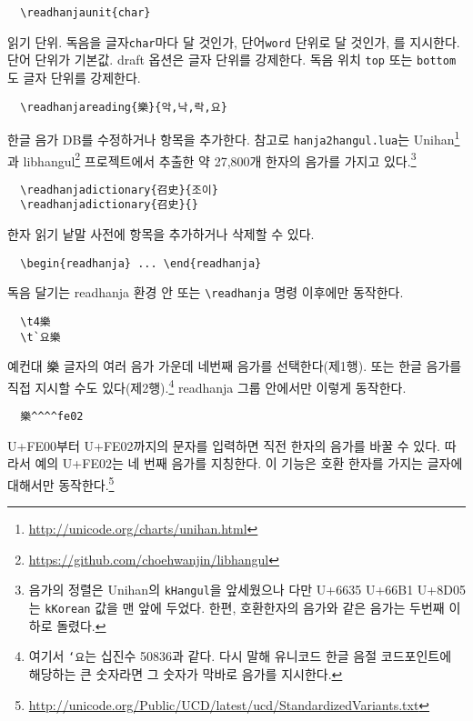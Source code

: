 \documentclass[b5paper]{article}
\begin{document}
\begin{verbatim}
  \readhanjaunit{char}
\end{verbatim}
읽기 단위. 독음을 글자\verb|char|마다 달 것인가, 단어\verb|word| 단위로
달 것인가, 를 지시한다. 단어 단위가 기본값.
draft 옵션은 글자 단위를 강제한다.
독음 위치 \verb|top| 또는 \verb|bottom|도 글자 단위를 강제한다.

\begin{verbatim}
  \readhanjareading{樂}{악,낙,락,요}
\end{verbatim}
한글 음가 DB를 수정하거나 항목을 추가한다. 참고로 \verb|hanja2hangul.lua|는
Unihan\footnote{\url{http://unicode.org/charts/unihan.html}}과
libhangul\footnote{\url{https://github.com/choehwanjin/libhangul}}
프로젝트에서 추출한 약 27,800개 한자의 음가를
가지고 있다.\footnote{음가의 정렬은 Unihan의 \texttt{kHangul}을 앞세웠으나
  다만 \mbox{U+6635} \mbox{U+66B1} \mbox{U+8D05}는 \texttt{kKorean} 값을
  맨 앞에 두었다. 한편, 호환한자의 음가와 같은 음가는 두번째 이하로 돌렸다.}

\begin{verbatim}
  \readhanjadictionary{召史}{조이}
  \readhanjadictionary{召史}{}
\end{verbatim}
한자 읽기 낱말 사전에 항목을 추가하거나 삭제할 수 있다.

\begin{verbatim}
  \begin{readhanja} ... \end{readhanja}
\end{verbatim}
독음 달기는 readhanja 환경 안 또는 \verb|\readhanja| 명령 이후에만 동작한다.

\begin{verbatim}
  \t4樂
  \t`요樂
\end{verbatim}
예컨대 樂 글자의 여러 음가 가운데 네번째 음가를 선택한다(제1행).
또는 한글 음가를 직접 지시할 수도 있다(제2행).\footnote{여기서 \texttt{`요}는 십진수 50836과 같다.
  다시 말해 유니코드 한글 음절 코드포인트에 해당하는 큰 숫자라면 그 숫자가 막바로 음가를 지시한다.}
readhanja 그룹 안에서만 이렇게 동작한다.

\begin{verbatim}
  樂^^^^fe02
\end{verbatim}
\mbox{U+FE00}부터 \mbox{U+FE02}까지의 문자를 입력하면 직전 한자의 음가를
바꿀 수 있다. 따라서 예의 \mbox{U+FE02}는 네 번째 음가를 지칭한다.
이 기능은 호환 한자를 가지는 글자에 대해서만 동작한다.\footnote{
\url{http://unicode.org/Public/UCD/latest/ucd/StandardizedVariants.txt}}
\end{document}
